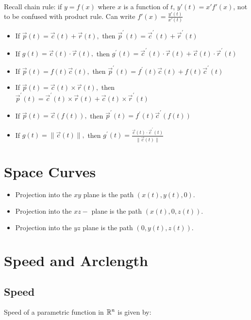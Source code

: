 Recall chain rule: if $y=f(x)$ where $x$ is a function of $t$, $y'(t)=x'f'(x)$, not to be confused with product rule.
Can write $f'(x)=\frac{y'(t)}{x'(t)}$

\begin{itemize}
    \item If $\vec{p}(t)=\vec{c}(t)+\vec{r}(t),$ then $\vec{p}^{\prime}(t)=\vec{c}^{\prime}(t)+\vec{r}^{\prime}(t)$
    \item If $g(t)=\vec{c}(t) \cdot \vec{r}(t),$ then $g^{\prime}(t)=\vec{c}^{\prime}(t) \cdot \vec{r}(t)+\vec{c}(t) \cdot \vec{r}^{\prime}(t)$
    \item If $\vec{p}(t)=f(t) \vec{c}(t),$ then $\vec{p}^{\prime}(t)=f^{\prime}(t) \vec{c}(t)+f(t) \vec{c}^{\prime}(t)$
    \item If $\vec{p}(t)=\vec{c}(t) \times \vec{r}(t),$ then $\vec{p}^{\prime}(t)=\vec{c}^{\prime}(t) \times \vec{r}(t)+\vec{c}(t) \times \vec{r}^{\prime}(t)$
    \item If $\vec{p}(t)=\vec{c}(f(t)),$ then $\vec{p}^{\prime}(t)=f^{\prime}(t) \vec{c}^{\prime}(f(t))$
    \item If $g(t)=\|\vec{c}(t)\|,$ then $g^{\prime}(t)=\frac{\vec{c}(t) \cdot \vec{c}^{\prime}(t)}{\|\vec{c}(t)\|}$
\end{itemize}

\section{Space Curves}

\begin{itemize}
    \item Projection into the $x y$ plane is the path $(x(t), y(t), 0)$.
    \item Projection into the $x z-$ plane is the path $(x(t), 0, z(t))$.
    \item Projection into the $y z$ plane is the path $(0, y(t), z(t))$.
\end{itemize}

\section{Speed and Arclength}

\subsection{Speed}

Speed of a parametric function in $\mathbb{R}^n$ is given by:

